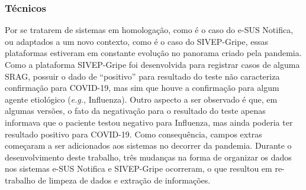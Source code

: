 \subsubsection*{Técnicos}

Por se tratarem de sistemas em homologação, como é o caso do e-SUS Notifica, ou adaptados a um novo contexto, como é o caso do SIVEP-Gripe, essas plataformas estiveram em constante evolução no panorama criado pela pandemia. 
Como a plataforma SIVEP-Gripe foi desenvolvida para registrar casos de alguma SRAG, possuir o dado de ``positivo'' para resultado do teste não caracteriza confirmação para COVID-19, mas sim que houve a confirmação para algum agente etiológico (\textit{e.g.}, Influenza). 
Outro aspecto a ser observado é que, em algumas versões, o fato da negativação para o resultado do teste apenas informava que o paciente testou negativo para Influenza, mas ainda poderia ter resultado positivo para COVID-19. 
Como consequência, campos extras começaram a ser adicionados aos sistemas no decorrer da pandemia. 
Durante o desenvolvimento deste trabalho, três mudanças na forma de organizar os dados nos sistemas e-SUS Notifica e SIVEP-Gripe ocorreram, o que resultou em re-trabalho de limpeza de dados e extração de informações.